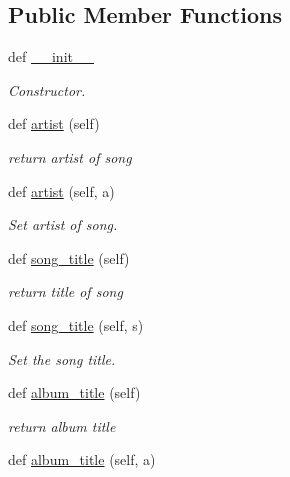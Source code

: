\subsection*{Public Member Functions}
\begin{DoxyCompactItemize}
\item 
def \hyperlink{classbridges_1_1data__src__dependent_1_1song_1_1_song_a7f7384595782d5a3a829aa9f96a92845}{\+\_\+\+\_\+init\+\_\+\+\_\+}
\begin{DoxyCompactList}\small\item\em Constructor. \end{DoxyCompactList}\item 
def \hyperlink{classbridges_1_1data__src__dependent_1_1song_1_1_song_a82ffeb5ab815a4e5028f113e8eb2a482}{artist} (self)
\begin{DoxyCompactList}\small\item\em return artist of song \end{DoxyCompactList}\item 
def \hyperlink{classbridges_1_1data__src__dependent_1_1song_1_1_song_a918ecca7107f6af77f5b15d2bee5ea98}{artist} (self, a)
\begin{DoxyCompactList}\small\item\em Set artist of song. \end{DoxyCompactList}\item 
def \hyperlink{classbridges_1_1data__src__dependent_1_1song_1_1_song_a1c34d8af79451417060ee5d1e860e31e}{song\+\_\+title} (self)
\begin{DoxyCompactList}\small\item\em return title of song \end{DoxyCompactList}\item 
def \hyperlink{classbridges_1_1data__src__dependent_1_1song_1_1_song_aa1f51734629030528f5bc86a6b2478f1}{song\+\_\+title} (self, s)
\begin{DoxyCompactList}\small\item\em Set the song title. \end{DoxyCompactList}\item 
def \hyperlink{classbridges_1_1data__src__dependent_1_1song_1_1_song_a5ecb8e966ffd3659875ed3b751ed294c}{album\+\_\+title} (self)
\begin{DoxyCompactList}\small\item\em return album title \end{DoxyCompactList}\item 
def \hyperlink{classbridges_1_1data__src__dependent_1_1song_1_1_song_a62f0c444ecc16f3d87cfd0b3e0d60b52}{album\+\_\+title} (self, a)

\end{DoxyCompactItemize}
